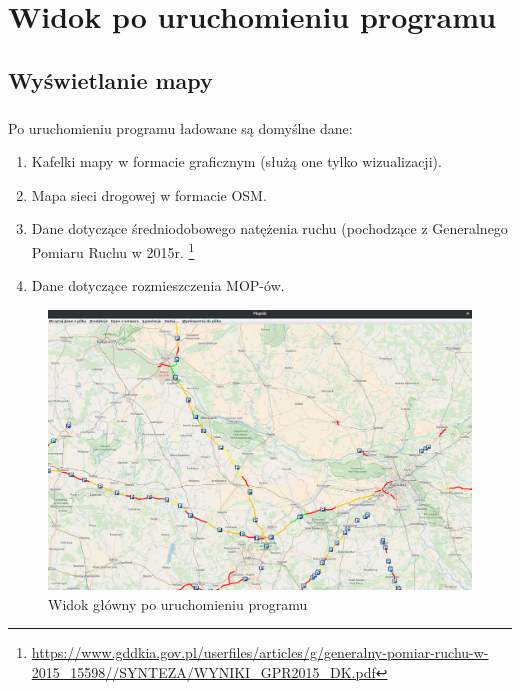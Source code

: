 \documentclass[10pt,paper=a4 BCOR0, DIV15, titlepage=false, oneside]{scrbook} %
\renewcommand{\contentsname}{Instrukcja obsługi programu Mopnik}
\begin{document}
\tableofcontents 

    \chapter*{Widok po uruchomieniu programu}
    \addtocounter{chapter}{1}
    \section{Wyświetlanie mapy}
    \paragraph{}
    Po uruchomieniu programu ładowane są domyślne dane:
    \begin{enumerate}
    \item Kafelki mapy w formacie graficznym (służą one tylko wizualizacji).
    \item Mapa sieci drogowej w formacie OSM.
    \item Dane dotyczące średniodobowego natężenia ruchu (pochodzące z
      Generalnego Pomiaru Ruchu w 2015r.
      \footnote{\url{https://www.gddkia.gov.pl/userfiles/articles/g/generalny-pomiar-ruchu-w-2015_15598//SYNTEZA/WYNIKI_GPR2015_DK.pdf}}
    \item Dane dotyczące rozmieszczenia MOP-ów.
    \end{enumerate}
 \begin{figure}[ht]
      \centering
      \includegraphics[width=\textwidth]{widok_glowny.png}
      \caption{Widok główny po uruchomieniu programu}
    \end {figure}
    
\end{document}
